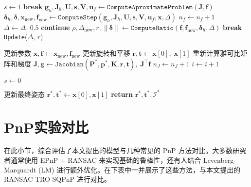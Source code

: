 \begin{algorithm}[!htbp]
\begin{spacing}{0.9}
\begin{algorithmic}[1]
			\State $s \gets 1$
			\State \textbf{break}
			\EndIf
			\State $\mathbf{g}_h, \mathbf{J}_h, \mathbf{U}, \mathbf{s}, \mathbf{V}, \mathbf{u}_f \gets \texttt{ComputeAproximateProblem}(\mathbf{J}, \mathbf{f})$
			\State $\boldsymbol{\delta}_h, \boldsymbol{\delta}, \mathbf{x}_{\text{new}}, \mathbf{f}_{\text{new}} \gets \texttt{ComputeStep}(\mathbf{g}_h, \mathbf{J}_h, \mathbf{U}, \mathbf{s}, \mathbf{V}, \mathbf{u}_f, \mathbf{x}, \Delta)$
			\State $n_f \gets n_f + 1$
			\State $\Delta \gets \Delta \cdot 0.5$
			\State \textbf{continue}
			\EndIf
			\State $\rho, \Delta_{\text{new}}, r, \|\boldsymbol{\delta}\| \gets \texttt{ComputeRatio}(\mathbf{f}, \mathbf{f}_{\text{new}}, \boldsymbol{\delta}_h, \Delta)$
			\State \textbf{break}
			\EndIf
			\State \texttt{Update}($\Delta$, $r$)
			\EndWhile
			
			\State 更新参数 $\mathbf{x}, \mathbf{f} \gets \mathbf{x}_{\text{new}}, \mathbf{f}_{\text{new}}$
			\State 更新旋转和平移 $\mathbf{r}, \mathbf{t} \gets \mathbf{x}[0],\;\mathbf{x}[1]$
			\State 重新计算雅可比矩阵和梯度 
			$\mathbf{J}, \mathbf{g} \gets \texttt{Jacobian}(\mathbf{P}^*, \mathbf{p}^*, \mathbf{K}, \mathbf{r}, \mathbf{t}),\; \mathbf{J}^\top \mathbf{f}$
			\State $n_J \gets n_J + 1$
			\EndIf
			\State $i \gets i + 1$
			\EndWhile
			
			\State $s \gets 0$
			\EndIf
			
			\State 更新最终姿态 $\mathbf{r}^*, \mathbf{t}^* \gets \mathbf{x}[0], \mathbf{x}[1]$
			\State \textbf{return} $\mathbf{r}^*, \mathbf{t}^*, \mathcal{I}^*$
			\EndProcedure
		\end{algorithmic}
	\end{spacing}
\end{algorithm}





\section{PnP实验对比}
\label{sec:RANSAC-TRO-SQPnP:ExperimentCompare}
\vspace{1ex}

在此小节，综合评估了本文提出的模型与几种常见的 PnP 方法对比。大多数研究者通常使用 EPnP \cite{EPnP} + RANSAC 来实现基础的鲁棒性，还有人结合 Levenberg-Marquardt (LM) 进行额外优化。在下表中一并展示了这些方法，与本文提出的 RANSAC-TRO SQPnP 进行对比。

